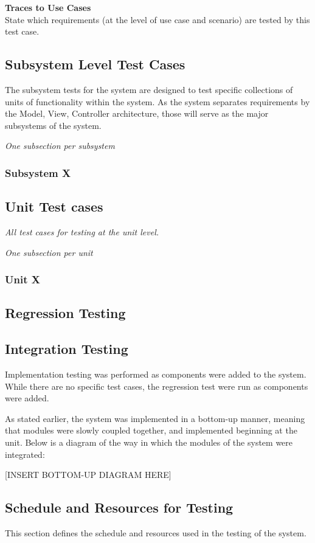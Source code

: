 \documentclass[12pt]{article}
\begin{document}
\noindent
{\bf Traces to Use Cases}\\
State which requirements (at the level of use case and scenario) are tested by this test case.

\subsection{Subsystem Level Test Cases}

{
The subsystem tests for the system are designed to test specific collections of units of functionality within the system. As the system separates requirements by the Model, View, Controller architecture, those will serve as the major subsystems of the system.
}

{\it
One subsection per subsystem
}

\subsubsection{Subsystem X}

\subsection{Unit Test cases}

{\it
All test cases for testing at the unit level.
}

{\it
One subsection per unit
}

\subsubsection{Unit X}
\subsection{Regression Testing}
\subsection{Integration Testing}
{
Implementation testing was performed as components were added to the system. While there are no specific test cases, the regression test were run as components were added.

As stated earlier, the system was implemented in a bottom-up manner, meaning that modules were slowly coupled together, and implemented beginning at the unit. Below is a diagram of the way in which the modules of the system were integrated:

[INSERT BOTTOM-UP DIAGRAM HERE]
}
\subsection{Schedule and Resources for Testing}
{
This section defines the schedule and resources used in the testing of the system.
}
\end{document}
